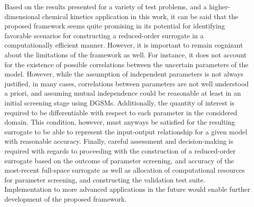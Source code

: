 Based on the results presented for a variety of test problems, and a
higher-dimensional chemical kinetics application in this work, it can be said
that the proposed framework seems quite promising in its potential for
identifying favorable scenarios for constructing a reduced-order surrogate in a
computationally efficient manner.  However, it is important to remain cognizant
about the limitations of the framework as well. For instance, it does not
account for the existence of possible correlations between the uncertain
parameters of the model. However, while the assumption of independent
parameters is not always justified, in many cases, correlations between
parameters are not well understood a priori, and assuming mutual independence
could be reasonable at least in an initial screening stage using DGSMs.
Additionally, the quantity of interest is required to be differentiable with
respect to each parameter in the considered domain. This condition, however,
must anyways be satisfied for the resulting surrogate to be able to represent
the input-output relationship for a given model with reasonable accuracy.
Finally, careful assessment and decision-making is required with regards to
proceeding with the construction of a reduced-order surrogate based on the
outcome of parameter screening, and accuracy of the most-recent full-space
surrogate as well as allocation of computational resources for parameter
screening, and constructing the validation test suite. Implementation to more
advanced applications in the future would enable further development of the
proposed framework. 

















